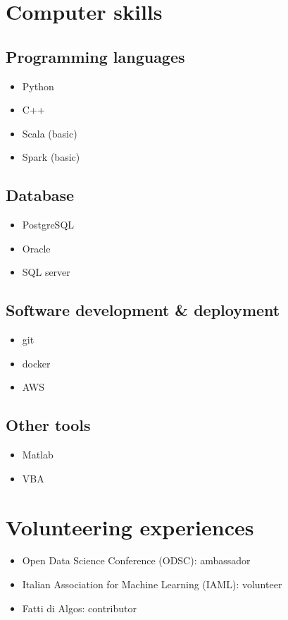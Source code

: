 \documentclass[11pt,a4paper,sans]{moderncv}        %
\begin{document}
\section{Computer skills}
\subsection{Programming languages}
\begin{itemize}
\item Python
\item C++
\item Scala (basic)
\item Spark (basic)
\end{itemize}
\subsection{Database}
\begin{itemize}
\item PostgreSQL
\item Oracle
\item SQL server
\end{itemize}
\subsection{Software development \& deployment}
\begin{itemize}
\item git
\item docker
\item AWS
\end{itemize}
\subsection{Other tools}
\begin{itemize}
\item Matlab
\item VBA
\end{itemize}

\section{Volunteering experiences}
\begin{itemize}
 \item Open Data Science Conference (ODSC): ambassador
 \item Italian Association for Machine Learning (IAML): volunteer
 \item Fatti di Algos: contributor
\end{itemize} 
\end{document}
